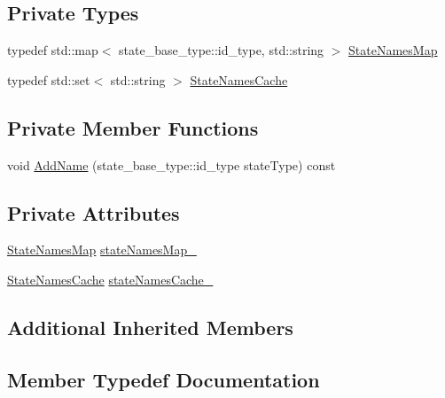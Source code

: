 \subsection*{Private Types}
\begin{DoxyCompactItemize}
\item 
typedef std\+::map$<$ state\+\_\+base\+\_\+type\+::id\+\_\+type, std\+::string $>$ \mbox{\hyperlink{struct_termination_test_ad548ac63b569644d5f8a7fcc452a1729}{State\+Names\+Map}}
\item 
typedef std\+::set$<$ std\+::string $>$ \mbox{\hyperlink{struct_termination_test_a410a8e606d2928905c6fffcafaf34bbb}{State\+Names\+Cache}}
\end{DoxyCompactItemize}
\subsection*{Private Member Functions}
\begin{DoxyCompactItemize}
\item 
void \mbox{\hyperlink{struct_termination_test_adbc9e083971e138c6ce231d4b1287a80}{Add\+Name}} (state\+\_\+base\+\_\+type\+::id\+\_\+type state\+Type) const
\end{DoxyCompactItemize}
\subsection*{Private Attributes}
\begin{DoxyCompactItemize}
\item 
\mbox{\hyperlink{struct_termination_test_ad548ac63b569644d5f8a7fcc452a1729}{State\+Names\+Map}} \mbox{\hyperlink{struct_termination_test_ad2693f04b3af0af6781c1af3d474d7b8}{state\+Names\+Map\+\_\+}}
\item 
\mbox{\hyperlink{struct_termination_test_a410a8e606d2928905c6fffcafaf34bbb}{State\+Names\+Cache}} \mbox{\hyperlink{struct_termination_test_ae76341e7ca903c6ec445a1342bfba0a9}{state\+Names\+Cache\+\_\+}}
\end{DoxyCompactItemize}
\subsection*{Additional Inherited Members}


\subsection{Member Typedef Documentation}
\mbox{\label{struct_termination_test_a410a8e606d2928905c6fffcafaf34bbb}} 
